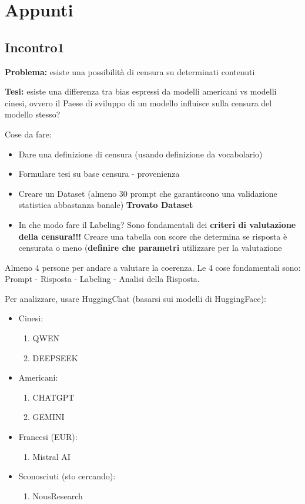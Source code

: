 \section{Appunti}
\subsection{Incontro1}
\textbf{Problema:} esiste una possibilità di censura su determinati contenuti 

\textbf{Tesi:} esiste una differenza tra bias espressi da modelli americani vs modelli cinesi, ovvero il Paese di sviluppo di un modello influisce sulla censura del modello stesso?

Cose da fare:
\begin{itemize}
    \item Dare una definizione di censura (usando definizione da vocabolario)
    \item Formulare tesi su base censura - provenienza
    \item Creare un Dataset (almeno 30 prompt che garantiscono una validazione statistica abbastanza banale) 
    \textbf{Trovato Dataset}
    \item In che modo fare il Labeling? Sono fondamentali dei \textbf{criteri di valutazione della censura!!!}
    Creare una tabella con score che determina se risposta è censurata o meno (\textbf{definire che parametri} utilizzare per la valutazione
\end{itemize}

Almeno 4 persone per andare a valutare la coerenza. Le 4 cose fondamentali sono:
Prompt - Risposta - Labeling - Analisi della Risposta.

Per analizzare, usare HuggingChat (basarsi sui modelli di HuggingFace):
\begin{itemize}
    \item Cinesi:
    \begin{enumerate}
        \item QWEN
        \item DEEPSEEK
    \end{enumerate}
    \item Americani:
    \begin{enumerate}
        \item CHATGPT
        \item GEMINI
    \end{enumerate}
    \item Francesi (EUR):
    \begin{enumerate}
        \item Mistral AI
    \end{enumerate}
    \item Sconosciuti (sto cercando):
    \begin{enumerate}
        \item NousResearch
    \end{enumerate}
\end{itemize}

